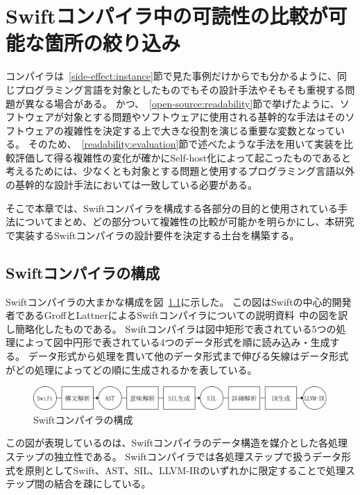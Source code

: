 \chapter{Swiftコンパイラ中の可読性の比較が可能な箇所の絞り込み}
\label{refinement}

コンパイラは~\ref{side-effect:instance}節で見た事例だけからでも分かるように、同じプログラミング言語を対象としたものでもその設計手法やそもそも重視する問題が異なる場合がある。
かつ、~\ref{open-source:readability}節で挙げたように、ソフトウェアが対象とする問題やソフトウェアに使用される基幹的な手法はそのソフトウェアの複雑性を決定する上で大きな役割を演じる重要な変数となっている。
そのため、~\ref{readability:evaluation}節で述べたような手法を用いて実装を比較評価して得る複雑性の変化が確かにSelf-host化によって起こったものであると考えるためには、少なくとも対象とする問題と使用するプログラミング言語以外の基幹的な設計手法においては一致している必要がある。

そこで本章では、Swiftコンパイラを構成する各部分の目的と使用されている手法についてまとめ、どの部分ついて複雑性の比較が可能かを明らかにし、本研究で実装するSwiftコンパイラの設計要件を決定する土台を構築する。

\section{Swiftコンパイラの構成}
\label{refinement:structure}

Swiftコンパイラの大まかな構成を図~\ref{img:swift-compiler-process}に示した。
この図はSwiftの中心的開発者であるGroffとLattnerによるSwiftコンパイラについての説明資料~\cite{sil}中の図を訳し簡略化したものである。
Swiftコンパイラは図中矩形で表されている5つの処理によって図中円形で表されている4つのデータ形式を順に読み込み・生成する。
データ形式から処理を貫いて他のデータ形式まで伸びる矢線はデータ形式がどの処理によってどの順に生成されるかを表している。

\begin{figure}
    \begin{center}
        \includegraphics[scale=0.5]{./img/swift_compiler_process.png}
        \caption{Swiftコンパイラの構成}
        \label{img:swift-compiler-process}
    \end{center}
\end{figure}

この図が表現しているのは、Swiftコンパイラのデータ構造を媒介とした各処理ステップの独立性である。
Swiftコンパイラでは各処理ステップで扱うデータ形式を原則としてSwift、AST、SIL、LLVM-IRのいずれかに限定することで処理ステップ間の結合を疎にしている。

